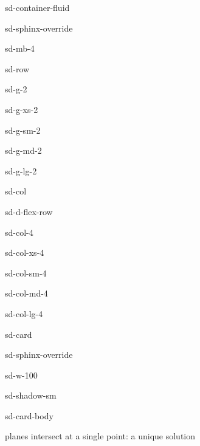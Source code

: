 \documentclass[letterpaper,10pt,english]{jupyterBook}
\begin{document}
\begin{sphinxuseclass}{sd-container-fluid}
\begin{sphinxuseclass}{sd-sphinx-override}
\begin{sphinxuseclass}{sd-mb-4}
\begin{sphinxuseclass}{sd-row}
\begin{sphinxuseclass}{sd-g-2}
\begin{sphinxuseclass}{sd-g-xs-2}
\begin{sphinxuseclass}{sd-g-sm-2}
\begin{sphinxuseclass}{sd-g-md-2}
\begin{sphinxuseclass}{sd-g-lg-2}
\begin{sphinxuseclass}{sd-col}
\begin{sphinxuseclass}{sd-d-flex-row}
\begin{sphinxuseclass}{sd-col-4}
\begin{sphinxuseclass}{sd-col-xs-4}
\begin{sphinxuseclass}{sd-col-sm-4}
\begin{sphinxuseclass}{sd-col-md-4}
\begin{sphinxuseclass}{sd-col-lg-4}
\begin{sphinxuseclass}{sd-card}
\begin{sphinxuseclass}{sd-sphinx-override}
\begin{sphinxuseclass}{sd-w-100}
\begin{sphinxuseclass}{sd-shadow-sm}
\begin{sphinxuseclass}{sd-card-body}
\begin{figure}[htbp]
\centering

\noindent{}
\end{figure}

 planes intersect at a single point: a unique solution


\end{sphinxuseclass}
\end{sphinxuseclass}
\end{sphinxuseclass}
\end{sphinxuseclass}
\end{sphinxuseclass}
\end{sphinxuseclass}
\end{sphinxuseclass}
\end{sphinxuseclass}
\end{sphinxuseclass}
\end{sphinxuseclass}
\end{sphinxuseclass}
\end{sphinxuseclass}
\end{sphinxuseclass}
\end{sphinxuseclass}
\end{sphinxuseclass}
\end{sphinxuseclass}
\end{sphinxuseclass}
\end{sphinxuseclass}
\end{sphinxuseclass}
\end{sphinxuseclass}
\end{sphinxuseclass}
\end{document}
